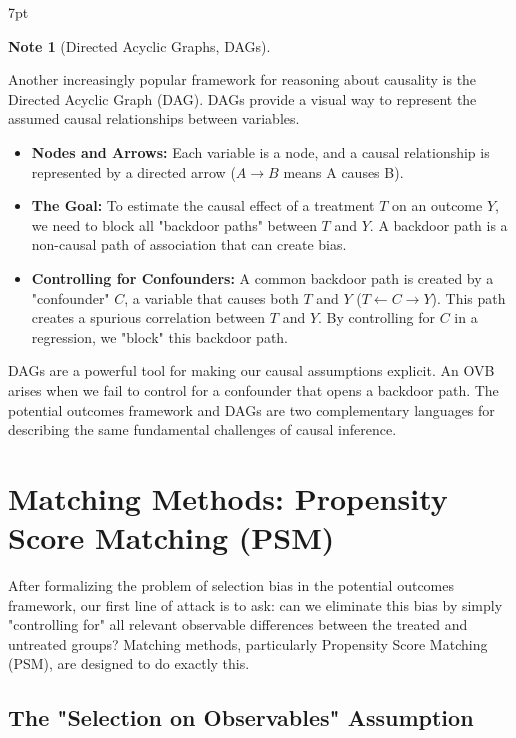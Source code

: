 \documentclass{article}
\providecommand{\tightlist}{
  \setlength{\itemsep}{0pt}
  \setlength{\parskip}{0pt}}
\newenvironment{blueblock}{
\def\FrameCommand{
  \hspace{1pt}
    {\color{DarkBlue}
    \vrule width 2pt}
    {\color{blueshade}
    \vrule width 4pt}
  \colorbox{blueshade}
}
\MakeFramed{
  \advance
  \hsize-
  \width
  \FrameRestore}
\noindent\hspace{-4.55pt}%
\begin{adjustwidth}{}{7pt}
\vspace{2pt}\vspace{2pt}
}
{\vspace{2pt}\end{adjustwidth}\endMakeFramed}
\newtheorem{note}{Note}
\begin{document}
\begin{blueblock}
\begin{note}[Directed Acyclic Graphs, DAGs]
\end{note}
Another increasingly popular framework for reasoning about causality is the Directed Acyclic Graph (DAG). DAGs provide a visual way to represent the assumed causal relationships between variables.
\begin{itemize}
    \tightlist
    \item \textbf{Nodes and Arrows:} Each variable is a node, and a causal relationship is represented by a directed arrow ($A \rightarrow B$ means A causes B).
    \item \textbf{The Goal:} To estimate the causal effect of a treatment $T$ on an outcome $Y$, we need to block all "backdoor paths" between $T$ and $Y$. A backdoor path is a non-causal path of association that can create bias.
    \item \textbf{Controlling for Confounders:} A common backdoor path is created by a "confounder" $C$, a variable that causes both $T$ and $Y$ ($T \leftarrow C \rightarrow Y$). This path creates a spurious correlation between $T$ and $Y$. By controlling for $C$ in a regression, we "block" this backdoor path.
\end{itemize}
DAGs are a powerful tool for making our causal assumptions explicit. An OVB arises when we fail to control for a confounder that opens a backdoor path. The potential outcomes framework and DAGs are two complementary languages for describing the same fundamental challenges of causal inference.
\end{blueblock}






\section{Matching Methods: Propensity Score Matching (PSM)}
\label{sec:psm}

After formalizing the problem of selection bias in the potential outcomes framework, our first line of attack is to ask: can we eliminate this bias by simply "controlling for" all relevant observable differences between the treated and untreated groups? Matching methods, particularly Propensity Score Matching (PSM), are designed to do exactly this.

\subsection{The "Selection on Observables" Assumption}
\label{sub:selection_on_observables}
\end{document}
